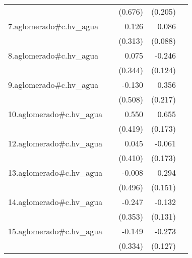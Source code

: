 {\begin{longtable}{l*{4}{D{.}{.}{-1}}}
            &                     &     (0.676)         &     (0.205)         &                     \\
\addlinespace
7.aglomerado#c.hv\_agua&                     &       0.126         &       0.086         &                     \\
            &                     &     (0.313)         &     (0.088)         &                     \\
\addlinespace
8.aglomerado#c.hv\_agua&                     &       0.075         &      -0.246\sym{*}  &                     \\
            &                     &     (0.344)         &     (0.124)         &                     \\
\addlinespace
9.aglomerado#c.hv\_agua&                     &      -0.130         &       0.356         &                     \\
            &                     &     (0.508)         &     (0.217)         &                     \\
\addlinespace
10.aglomerado#c.hv\_agua&                     &       0.550         &       0.655\sym{***}&                     \\
            &                     &     (0.419)         &     (0.173)         &                     \\
\addlinespace
12.aglomerado#c.hv\_agua&                     &       0.045         &      -0.061         &                     \\
            &                     &     (0.410)         &     (0.173)         &                     \\
\addlinespace
13.aglomerado#c.hv\_agua&                     &      -0.008         &       0.294         &                     \\
            &                     &     (0.496)         &     (0.151)         &                     \\
\addlinespace
14.aglomerado#c.hv\_agua&                     &      -0.247         &      -0.132         &                     \\
            &                     &     (0.353)         &     (0.131)         &                     \\
\addlinespace
15.aglomerado#c.hv\_agua&                     &      -0.149         &      -0.273\sym{*}  &                     \\
            &                     &     (0.334)         &     (0.127)         &                     \\

\end{longtable}}
